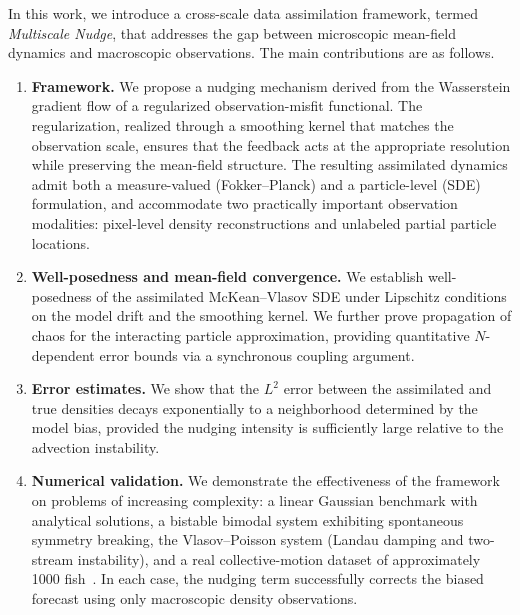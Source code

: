 In this work, we introduce a cross-scale data assimilation framework, termed \emph{Multiscale Nudge}, that addresses the gap between microscopic mean-field dynamics and macroscopic observations. The main contributions are as follows.
\begin{enumerate}
    \item \textbf{Framework.} We propose a nudging mechanism derived from the Wasserstein gradient flow of a regularized observation-misfit functional. The regularization, realized through a smoothing kernel that matches the observation scale, ensures that the feedback acts at the appropriate resolution while preserving the mean-field structure. The resulting assimilated dynamics admit both a measure-valued (Fokker--Planck) and a particle-level (SDE) formulation, and accommodate two practically important observation modalities: pixel-level density reconstructions and unlabeled partial particle locations.
    \item \textbf{Well-posedness and mean-field convergence.} We establish well-posedness of the assimilated McKean--Vlasov SDE under Lipschitz conditions on the model drift and the smoothing kernel. We further prove propagation of chaos for the interacting particle approximation, providing quantitative $N$-dependent error bounds via a synchronous coupling argument.
    \item \textbf{Error estimates.}  We show that the $L^2$ error between the assimilated and true densities decays exponentially to a neighborhood determined by the model bias, provided the nudging intensity is sufficiently large relative to the advection instability.
    \item \textbf{Numerical validation.} We demonstrate the effectiveness of the framework on problems of increasing complexity: a linear Gaussian benchmark with analytical solutions, a bistable bimodal system exhibiting spontaneous symmetry breaking, the Vlasov--Poisson system (Landau damping and two-stream instability), and a real collective-motion dataset of approximately 1000 fish~\cite{walter2021trex}. In each case, the nudging term successfully corrects the biased forecast using only macroscopic density observations.
\end{enumerate}


